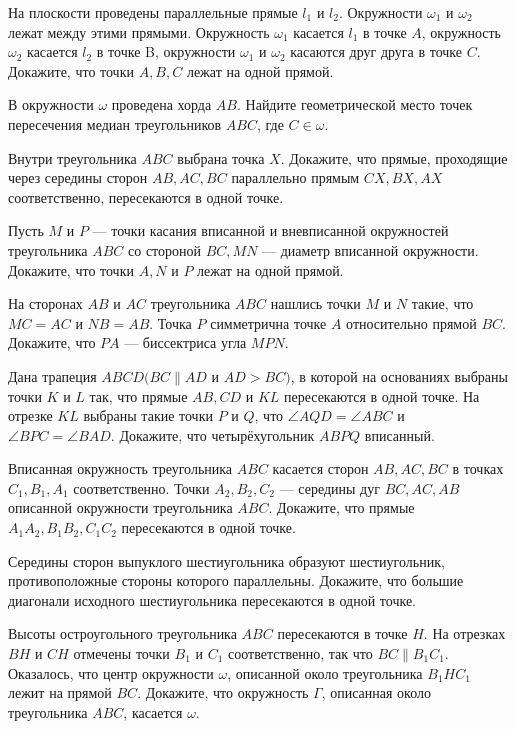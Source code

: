 \documentclass{article}
\begin{document}
\begin{enumerate_boxed}
        \item На плоскости проведены параллельные прямые $l_1$ и $l_2$.
        Окружности $\omega_1$ и $\omega_2$ лежат между этими прямыми.
        Окружность $\omega_1$ касается $l_1$ в точке $A$, окружность $\omega_2$ касается $l_2$ в точке B, окружности $\omega_1$ и $\omega_2$ касаются друг друга в точке $C$.
        Докажите, что точки $A, B, C$ лежат на одной прямой.

        \item В окружности $\omega$ проведена хорда $AB$.
        Найдите геометрической место точек пересечения медиан треугольников $ABC$, где $C\in \omega$.

        \item Внутри треугольника $ABC$ выбрана точка $X$.
        Докажите, что прямые, проходящие через середины сторон $AB, AC, BC$ параллельно прямым $CX, BX, AX$ соответственно, пересекаются в одной точке.

        \item Пусть $M$ и $P$ — точки касания вписанной и вневписанной окружностей треугольника $ABC$ со стороной $BC, MN$ — диаметр вписанной окружности.
        Докажите, что точки $A, N$ и $P$ лежат на одной прямой.

        \item На сторонах $AB$ и $AC$ треугольника $ABC$ нашлись точки $M$ и $N$ такие, что $MC=AC$ и $NB=AB$.
        Точка $P$ симметрична точке $A$ относительно прямой $BC$.
        Докажите, что $PA$ — биссектриса угла $MPN$.

        \item Дана трапеция $ABCD (BC \parallel AD$ и $AD>BC)$, в которой на основаниях выбраны точки $K$ и $L$ так, что прямые $AB, CD$ и $KL$ пересекаются в одной точке.
        На отрезке $KL$ выбраны такие точки $P$ и $Q$, что $\angle AQD=\angle ABC$ и $\angle BPC=\angle BAD$.
        Докажите, что четырёхугольник $ABPQ$ вписанный.

        \item Вписанная окружность треугольника $ABC$ касается сторон $AB, AC, BC$ в точках $C_1, B_1, A_1$ соответственно.
        Точки $A_2, B_2, C_2$ — середины дуг $BC, AC, AB$ описанной окружности треугольника $ABC$.
        Докажите, что прямые $A_{1}A_2, B_{1}B_2, C_{1}C_2$ пересекаются в одной точке.

        \item Середины сторон выпуклого шестиугольника образуют шестиугольник, противоположные стороны которого параллельны.
        Докажите, что большие диагонали исходного шестиугольника пересекаются в одной точке.

        \item Высоты остроугольного треугольника $ABC$ пересекаются в точке $H$.
        На отрезках $BH$ и $CH$ отмечены точки $B_1$ и $C_1$ соответственно, так что $BC \parallel B_{1}C_1$.
        Оказалось, что центр окружности $\omega$, описанной около треугольника $B_{1}HC_1$ лежит на прямой $BC$.
        Докажите, что окружность $\varGamma$, описанная около треугольника $ABC$, касается $\omega$.

    \end{enumerate_boxed}
\end{document}
